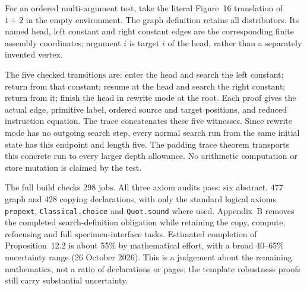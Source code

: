 For an ordered multi-argument test, take the literal Figure~16 translation
of $1+2$ in the empty environment. The graph definition retains all
distributors. Its named head, left constant and right constant edges are the
corresponding finite assembly coordinates; argument $i$ is target $i$ of the
head, rather than a separately invented vertex.






The five checked transitions are: enter the head and search the left
constant; return from that constant; resume at the head and search the right
constant; return from it; finish the head in rewrite mode at the root. Each
proof gives the actual edge, primitive label, ordered source and target
positions, and reduced instruction equation. The trace concatenates these
five witnesses. Since rewrite mode has no outgoing search step, every normal
search run from the same initial state has this endpoint and length five.
The padding trace theorem transports this concrete run to every larger depth
allowance. No arithmetic computation or store mutation is claimed by the test.









The full build checks 298 jobs. All three axiom audits pass: six abstract,
477 graph and 428 copying declarations, with only the standard logical axioms
\texttt{propext}, \texttt{Classical.choice} and \texttt{Quot.sound} where used.
Appendix~B removes the completed search-definition obligation while retaining
the copy, compute, refocusing and full specimen-interface tasks. Estimated
completion of Proposition~12.2 is about 55\% by mathematical effort, with a
broad 40--65\% uncertainty range (26 October 2026). This is a judgement about
the remaining mathematics, not a ratio of declarations or pages; the template
robustness proofs still carry substantial uncertainty.


